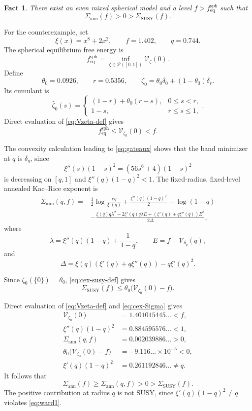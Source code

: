 \documentclass[a4paper,10pt,reqno]{amsart}
\numberwithin{equation}{section}
\newtheorem{fact}[proposition]{Fact}%
\newcommand{\mc}{\mathcal}
\newcommand{\eq}{\mathrm{eq}}
\newcommand{\zhat}{\widehat\zeta}
\begin{document}
	\begin{fact}
		There exist an even mixed spherical model and a level
		\(f>f_{\eq}^{\mathrm{sph}}\) such that
		\[
		\Sigma_{\mathrm{ann}}(f)>0>\Sigma_{\mathrm{SUSY}}(f).
		\]
	\end{fact}
	
	For the counterexample, set
	\[
	\xi(x)=x^8+2x^2,
	\qquad
	f=1.402,
	\qquad
	q=0.744.
	\]
	The spherical equilibrium free energy is
	\[
	f_{\eq}^{\mathrm{sph}}
	=
	\inf_{\zeta\in\mc P([0,1])}\mathcal V_\zeta(0).
	\]
	Define
	\[
	\theta_0=0.0926,
	\qquad
	r=0.5356,
	\qquad
	\zeta_0=\theta_0\delta_0+(1-\theta_0)\delta_r.
	\]
	Its cumulant is
	\[
	\zhat_0(s)=
	\begin{cases}
		(1-r)+\theta_0(r-s),&0\le s<r,\\
		1-s,&r\le s\le1,
	\end{cases}.
	\]
	Direct evaluation of \eqref{eq:Vzeta-def} gives
	\[
	f_{\eq}^{\mathrm{sph}}\le\mathcal V_{\zeta_0}(0)<f.
	\]
	
	The convexity calculation leading to \eqref{eq:gateaux} shows that the band
	minimizer at \(q\) is \(\delta_q\), since
	\[
	\xi''(s)(1-s)^2=(56s^6+4)(1-s)^2
	\]
	is decreasing on \([q,1]\) and \(\xi''(q)(1-q)^2<1\).
	The fixed-radius, fixed-level annealed Kac--Rice exponent is
	\begin{equation}\label{eq:cex-Sigma}
		\begin{split}
			\Sigma_{\mathrm{ann}}(q,f)
			={}&\frac12\log\frac{eq}{\xi'(q)}
			+\frac{\xi''(q)(1-q)^2}{2}
			-\log(1-q)\\
			&-
			\frac{
				\xi(q)q\lambda^2
				-2\xi'(q)q\lambda E
				+(\xi'(q)+q\xi''(q))E^2
			}{2\Delta},
		\end{split}
	\end{equation}
	where
	\[
	\lambda=\xi''(q)(1-q)+\frac1{1-q},
	\qquad
	E=f-\mathcal V_{\delta_q}(q),
	\]
	and
	\[
	\Delta
	=\xi(q)(\xi'(q)+q\xi''(q))-q\xi'(q)^2.
	\]
	
	Since \(\zeta_0(\{0\})=\theta_0\),
	\eqref{eq:cex-susy-def} gives
	\[
	\Sigma_{\mathrm{SUSY}}(f)
	\le\theta_0\bigl(\mathcal V_{\zeta_0}(0)-f\bigr).
	\]
	
	Direct evaluation of \eqref{eq:Vzeta-def} and
	\eqref{eq:cex-Sigma} gives
	\begin{equation*}
		\begin{aligned}
			\mathcal V_{\zeta_0}(0)
			&=1.401015445\ldots<f,\\
			\xi''(q)(1-q)^2
			&=0.884595576\ldots<1,\\
			\Sigma_{\mathrm{ann}}(q,f)
			&=0.002039886\ldots>0,\\
			\theta_0\bigl(\mathcal V_{\zeta_0}(0)-f\bigr)
			&=-9.116\ldots\times10^{-5}<0,\\
			\xi'(q)(1-q)^2
			&=0.261192846\ldots\ne q.
		\end{aligned}
	\end{equation*}
	It follows that
	\[
	\Sigma_{\mathrm{ann}}(f)
	\ge\Sigma_{\mathrm{ann}}(q,f)
	>0
	>\Sigma_{\mathrm{SUSY}}(f).
	\]
	The positive contribution at radius \(q\) is not SUSY, since
	\(\xi'(q)(1-q)^2\ne q\) violates \eqref{eq:ward1}.
	
	
	
	
\end{document}
